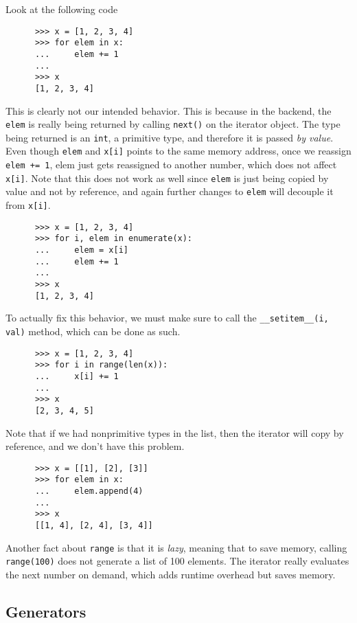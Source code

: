   \begin{example}
    Look at the following code 
    \begin{lstlisting}
      >>> x = [1, 2, 3, 4]
      >>> for elem in x: 
      ...     elem += 1 
      ... 
      >>> x
      [1, 2, 3, 4] 
    \end{lstlisting}
    This is clearly not our intended behavior. This is because in the backend, the \texttt{elem} is really being returned by calling \texttt{next()} on the iterator object. The type being returned is an \texttt{int}, a primitive type, and therefore it is passed \textit{by value}. Even though \texttt{elem} and \texttt{x[i]} points to the same memory address, once we reassign \texttt{elem += 1}, elem just gets reassigned to another number, which does not affect \texttt{x[i]}. Note that this does not work as well since \texttt{elem} is just being copied by value and not by reference, and again further changes to \texttt{elem} will decouple it from \texttt{x[i]}. 
    \begin{lstlisting}
      >>> x = [1, 2, 3, 4] 
      >>> for i, elem in enumerate(x): 
      ...     elem = x[i]
      ...     elem += 1
      ... 
      >>> x
      [1, 2, 3, 4] 
    \end{lstlisting}
    To actually fix this behavior, we must make sure to call the \texttt{\_\_setitem\_\_(i, val)} method, which can be done as such. 
    \begin{lstlisting}
      >>> x = [1, 2, 3, 4]
      >>> for i in range(len(x)): 
      ...     x[i] += 1 
      ... 
      >>> x
      [2, 3, 4, 5] 
    \end{lstlisting}
    Note that if we had nonprimitive types in the list, then the iterator will copy by reference, and we don't have this problem. 
    \begin{lstlisting}
      >>> x = [[1], [2], [3]]
      >>> for elem in x: 
      ...     elem.append(4)
      ... 
      >>> x
      [[1, 4], [2, 4], [3, 4]] 
    \end{lstlisting}
  \end{example}

  Another fact about \texttt{range} is that it is \textit{lazy}, meaning that to save memory, calling \texttt{range(100)} does not generate a list of 100 elements. The iterator really evaluates the next number on demand, which adds runtime overhead but saves memory.   

\subsection{Generators}

